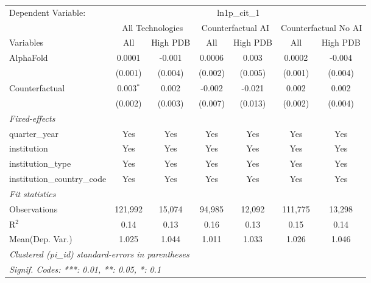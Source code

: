 \begingroup
\centering
\begin{tabular}{lcccccc}
   \tabularnewline \midrule \midrule
   Dependent Variable: & \multicolumn{6}{c}{ln1p\_cit\_1}\\
 & \multicolumn{2}{c}{All Technologies} & \multicolumn{2}{c}{Counterfactual AI} & \multicolumn{2}{c}{Counterfactual No AI} \\
\cmidrule(lr){1-1}\cmidrule(lr){2-3} \cmidrule(lr){4-5} \cmidrule(lr){6-7}
Variables & \multicolumn{1}{c}{All} & \multicolumn{1}{c}{High PDB} & \multicolumn{1}{c}{All} & \multicolumn{1}{c}{High PDB} & \multicolumn{1}{c}{All} & \multicolumn{1}{c}{High PDB} \\
\cmidrule(lr){1-1}\cmidrule(lr){2-2} \cmidrule(lr){3-3} \cmidrule(lr){4-4} \cmidrule(lr){5-5} \cmidrule(lr){6-6} \cmidrule(lr){7-7}
   AlphaFold                    & 0.0001      & -0.001  & 0.0006  & 0.003   & 0.0002  & -0.004\\   
                                & (0.001)     & (0.004) & (0.002) & (0.005) & (0.001) & (0.004)\\   
   Counterfactual               & 0.003$^{*}$ & 0.002   & -0.002  & -0.021  & 0.002   & 0.002\\   
                                & (0.002)     & (0.003) & (0.007) & (0.013) & (0.002) & (0.004)\\   
   \midrule
   \emph{Fixed-effects}\\
   quarter\_year                & Yes         & Yes     & Yes     & Yes     & Yes     & Yes\\  
   institution                  & Yes         & Yes     & Yes     & Yes     & Yes     & Yes\\  
   institution\_type            & Yes         & Yes     & Yes     & Yes     & Yes     & Yes\\  
   institution\_country\_code   & Yes         & Yes     & Yes     & Yes     & Yes     & Yes\\  
   \midrule
   \emph{Fit statistics}\\
   Observations                 & 121,992     & 15,074  & 94,985  & 12,092  & 111,775 & 13,298\\  
   R$^2$                        & 0.14        & 0.13    & 0.16    & 0.13    & 0.15    & 0.14\\  
Mean(Dep. Var.) & 1.025 & 1.044 & 1.011 & 1.033 & 1.026 & 1.046 \\
   \midrule \midrule
   \multicolumn{7}{l}{\emph{Clustered (pi\_id) standard-errors in parentheses}}\\
   \multicolumn{7}{l}{\emph{Signif. Codes: ***: 0.01, **: 0.05, *: 0.1}}\\
\end{tabular}
\par\endgroup
